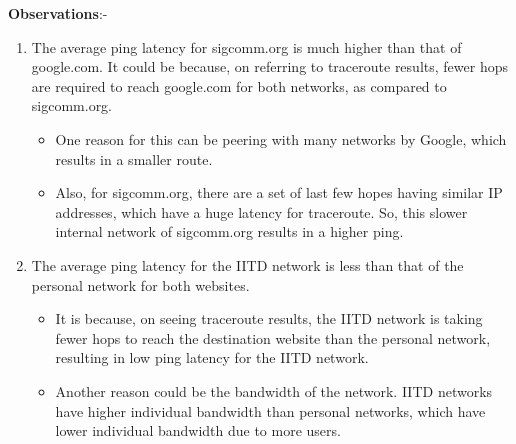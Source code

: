 \documentclass{article}
\begin{document}
\textbf{Observations}:-
\begin{enumerate}
    \item The average ping latency for sigcomm.org is much higher than that of google.com. It could be because, on referring to traceroute results, fewer hops are required to reach google.com for both networks, as compared to sigcomm.org.
        \begin{itemize}
        \item One reason for this can be peering with many networks by Google, which results in a smaller route. 
        \item Also, for sigcomm.org, there are a set of last few hopes having similar IP addresses, which have a huge latency for traceroute. So, this slower internal network of sigcomm.org results in a higher ping.
        \end{itemize}
    \item The average ping latency for the IITD network is less than that of the personal network for both websites. 
        \begin{itemize}
            \item It is because, on seeing traceroute results, the IITD network is taking fewer hops to reach the destination website than the personal network, resulting in low ping latency for the IITD network.
            \item Another reason could be the bandwidth of the network. IITD networks have higher individual bandwidth than personal networks, which have lower individual bandwidth due to more users.
        \end{itemize}
\end{enumerate}
\end{document}
